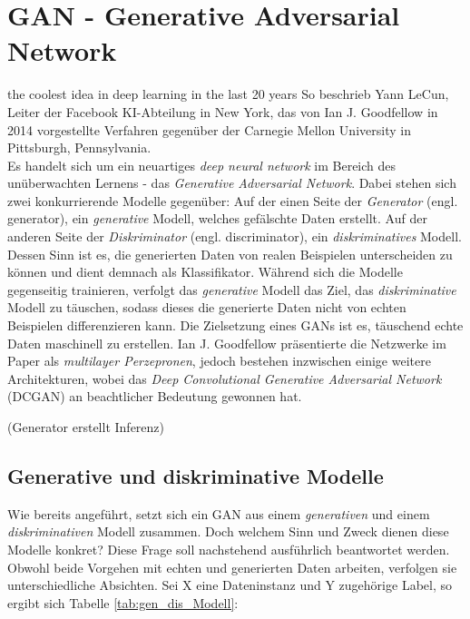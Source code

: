 \section{GAN - Generative Adversarial Network} \label{GAN}


\glq \glqq the coolest idea in deep learning in the last 20 years\grqq{} \grq{} \cite{0}
So beschrieb Yann LeCun, Leiter der Facebook KI-Abteilung in New York, das von Ian J. Goodfellow in 2014 vorgestellte Verfahren gegenüber der Carnegie Mellon University in Pittsburgh, Pennsylvania. \cite[vgl.][]{0} \\


Es handelt sich um ein neuartiges \textit{deep neural network} im Bereich des unüberwachten Lernens - das \textit{Generative Adversarial Network}. Dabei stehen sich zwei konkurrierende Modelle gegenüber:
Auf der einen Seite der \textit{Generator} (engl. generator), ein \textit{generative} Modell, welches gefälschte Daten erstellt. Auf der anderen Seite der \textit{Diskriminator} (engl. discriminator), ein \textit{diskriminatives} Modell. Dessen Sinn ist es, die generierten Daten von realen Beispielen unterscheiden zu können und dient demnach als Klassifikator.
Während sich die Modelle gegenseitig trainieren, verfolgt das \textit{generative} Modell das Ziel, das \textit{diskriminative} Modell zu täuschen, sodass dieses die generierte Daten nicht von echten Beispielen differenzieren kann.
Die Zielsetzung eines GANs ist es, täuschend echte Daten maschinell zu erstellen.
Ian J. Goodfellow präsentierte die Netzwerke im Paper \cite{4} als \textit{multilayer Perzepronen}, jedoch bestehen inzwischen einige weitere Architekturen, wobei das \textit{Deep Convolutional Generative Adversarial Network} (DCGAN) an beachtlicher Bedeutung gewonnen hat.
\cites[vgl.][]{4}[S. 5]{5}[S. 7]{6}

(Generator erstellt Inferenz)
\subsection{Generative und diskriminative Modelle}
Wie bereits angeführt, setzt sich ein GAN aus einem \textit{generativen} und einem \textit{diskriminativen} Modell zusammen. Doch welchem Sinn und Zweck dienen diese Modelle konkret? Diese Frage soll nachstehend ausführlich beantwortet werden. \\

Obwohl beide Vorgehen mit echten und generierten Daten arbeiten, verfolgen sie unterschiedliche Absichten. 
Sei X eine Dateninstanz und Y zugehörige Label, so ergibt sich Tabelle \ref{tab:gen_dis_Modell}:

